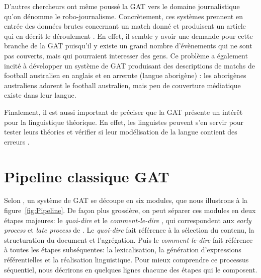 D'autres chercheurs ont même poussé la \ac{GAT} vers le domaine journalistique qu'on dénomme le robo-journalisme. Concrètement, ces systèmes prennent en entrée des données brutes concernant un match donné et produisent un article qui en décrit le déroulement \citep{W17-3513}. En effet, il semble y avoir une demande pour cette branche de la \ac{GAT} puisqu'il y existe un grand nombre d'évènements qui ne sont pas couverts, mais qui pourraient interesser des gens. Ce problème a également incité \citeauthor{dras12} à développer un système de \ac{GAT} produisant des descriptions de matchs de football australien en anglais et en arrernte (langue aborigène) \citep{lareau11a,dras12}: les aborigènes australiens adorent le football australien, mais peu de couverture médiatique existe dans leur langue.

Finalement, il est aussi important de préciser que la \ac{GAT} présente un intérêt pour la linguistique théorique. En effet, les linguistes peuvent s'en servir pour tester leurs théories et vérifier si leur modélisation de la langue contient des erreurs \citep{DanlosPresentationmodelegeneration1983}. 


\section{Pipeline classique GAT} \label{ppc}

Selon \cite{ReiterBuildingNaturalLanguage2000}, un système de \ac{GAT} se découpe en six modules, que nous illustrons à la figure~\ref{fig:Pipeline}. De façon plus grossière, on peut séparer ces modules en deux étapes majeures: le \emph{quoi-dire} et le \emph{comment-le-dire} \citep{DanlosPresentationmodelegeneration1983}, qui correspondent aux \emph{early process} et \emph{late process} de \cite{gatt18}. Le \emph{quoi-dire} fait référence à la sélection du contenu, la structuration du document et l'agrégation. Puis le \emph{comment-le-dire} fait référence à toutes les étapes subséquentes: la lexicalisation, la génération d'expressions référentielles et la réalisation linguistique. Pour mieux comprendre ce processus séquentiel, nous décrirons en quelques lignes chacune des étapes qui le composent.

